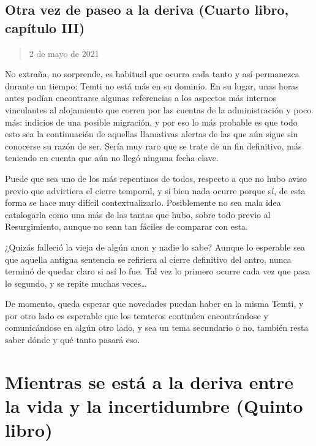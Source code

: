 \documentclass[
]{book}
\begin{document}
\hypertarget{otra-vez-de-paseo-a-la-deriva-cuarto-libro-capuxedtulo-iii}{%
\section{Otra vez de paseo a la deriva (Cuarto libro, capítulo III)}\label{otra-vez-de-paseo-a-la-deriva-cuarto-libro-capuxedtulo-iii}}

\begin{quote}
2 de mayo de 2021
\end{quote}

No extraña, no sorprende, es habitual que ocurra cada tanto y así permanezca durante un tiempo: Temti no está más en su dominio. En su lugar, unas horas antes podían encontrarse algunas referencias a los aspectos más internos vinculantes al alojamiento que corren por las cuentas de la administración y poco más: indicios de una posible migración, y por eso lo más probable es que todo esto sea la continuación de aquellas llamativas alertas de las que aún sigue sin conocerse su razón de ser. Sería muy raro que se trate de un fin definitivo, más teniendo en cuenta que aún no llegó ninguna fecha clave.

Puede que sea uno de los más repentinos de todos, respecto a que no hubo aviso previo que advirtiera el cierre temporal, y si bien nada ocurre porque sí, de esta forma se hace muy difícil contextualizarlo. Posiblemente no sea mala idea catalogarla como una más de las tantas que hubo, sobre todo previo al Resurgimiento, aunque no sean tan fáciles de comparar con esta.

¿Quizás falleció la vieja de algún anon y nadie lo sabe? Aunque lo esperable sea que aquella antigua sentencia se refiriera al cierre definitivo del antro, nunca terminó de quedar claro si así lo fue. Tal vez lo primero ocurre cada vez que pasa lo segundo, y se repite muchas veces\ldots{}

De momento, queda esperar que novedades puedan haber en la misma Temti, y por otro lado es esperable que los temteros continúen encontrándose y comunicándose en algún otro lado, y sea un tema secundario o no, también resta saber dónde y qué tanto pasará eso.

\hypertarget{mientras-se-estuxe1-a-la-deriva-entre-la-vida-y-la-incertidumbre-quinto-libro}{%
\chapter{Mientras se está a la deriva entre la vida y la incertidumbre (Quinto libro)}\label{mientras-se-estuxe1-a-la-deriva-entre-la-vida-y-la-incertidumbre-quinto-libro}}
\end{document}
